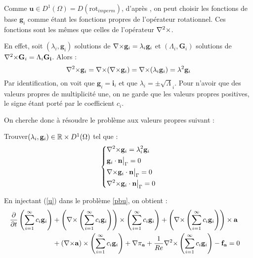 Comme $\mathbf{u}\in D^1(\Omega)=D(\mathrm{rot}_{imperm})$, d'après \cite{Penel2004}, on peut choisir les fonctions de base
$\mathbf{g}_i$ comme étant les fonctions propres de l'opérateur rotationnel. Ces
fonctions sont les mêmes que celles de l'opérateur ${\nabla^2\times}$.

En effet, soit $(\lambda_i,\mathbf{g}_i)$ solutions de ${\nabla\times} \mathbf{g}_i = \lambda_i\mathbf{g}_i$ et $(\Lambda_i,\mathbf{G}_i)$ solutions de ${\nabla^2\times} \mathbf{G}_i = \Lambda_i\mathbf{G_i}$. Alors :
\[ {\nabla^2\times} \mathbf{g}_i = {\nabla\times}({\nabla\times} \mathbf{g}_i)={\nabla\times}(\lambda_i\mathbf{g}_i)=\lambda^2\mathbf{g}_i \]
Par identification, on voit que $\mathbf{g}_i=\mathbf{i}_i$ et que $\lambda_i=\pm\sqrt\Lambda_i$. Pour n'avoir que des valeurs propres de multiplicité une, on ne garde que les valeurs propres positives, le signe étant porté par le coefficient $c_i$.

On cherche donc à résoudre le problème aux valeurs propres suivant :
\begin{pb}\label{curlcurl}
Trouver$(\lambda_i,\mathbf{g}_i)\in{\mathbb{R}}\times D^1(\Omega)$ tel que :
\begin{equation*}
\left\{\begin{aligned}
&{\nabla^2\times}  \mathbf{g}_i = \lambda_i^2 \mathbf{g}_i\\
&\mathbf{g}_i\cdot \mathbf{n}{\big\rvert_{\Gamma}} = 0\\
&{\nabla\times} \mathbf{g}_i\cdot \mathbf{n}{\big\rvert_{\Gamma}} = 0\\
&{\nabla^2\times}  \mathbf{g}_i\cdot \mathbf{n}{\big\rvert_{\Gamma}} = 0
\end{aligned}\right.
\end{equation*}\end{pb}

En injectant (\ref{u}) dans le problème \ref{pbu}, on obtient :
\begin{align*}
\frac{\partial}{\partial t}\left(\sum_{i=1}^\infty c_i\mathbf{g}_i\right) &+ \left({\nabla\times} \left(\sum_{i=1}^\infty c_i\mathbf{g}_i\right)\right)\times \left(\sum_{i=1}^\infty c_i\mathbf{g}_i\right) + \left({\nabla\times} \left(\sum_{i=1}^\infty c_i\mathbf{g}_i\right)\right)\times \mathbf{a}&\\
&+ ({\nabla\times} \mathbf{a})\times \left(\sum_{i=1}^\infty c_i\mathbf{g}_i\right) + {\nabla} \pi_{\mathbf{a}} +\frac{1}{Re}{\nabla^2\times}  \left(\sum_{i=1}^\infty c_i\mathbf{g}_i\right) - \mathbf{f_a} =0\\
\end{align*}

